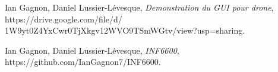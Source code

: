 \documentclass[journal]{IEEEtran}
\begin{document}
\begin{thebibliography}{1}

Ian Gagnon, Daniel Lussier-Lévesque, \emph{Demonstration du GUI pour drone},\newline
https://drive.google.com/file/d/\newline
1W9yt0Z4YxCwr0TjXkgv12WVO9TSmWGtv/view?usp=sharing.

Ian Gagnon, Daniel Lussier-Lévesque, \emph{INF6600},\newline
https://github.com/IanGagnon7/INF6600.


\end{thebibliography}


\end{document}
